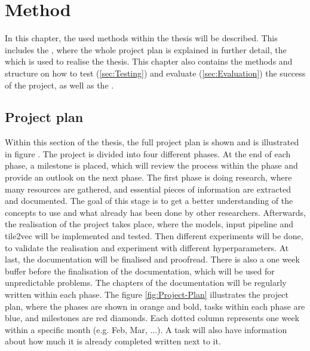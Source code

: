 \chapter{Method}
\label{ch:Method}

In this chapter, the used methods within the thesis will be described. This includes the , where the whole project plan is explained in further detail, the  which is used to realise the thesis. This chapter also contains the methods and structure on how to test (\ref{sec:Testing}) and evaluate (\ref{sec:Evaluation}) the success of the project, as well as the .

\section{Project plan}
\label{sec:Project-Plan}

Within this section of the thesis, the full project plan is shown and is illustrated in figure . The project is divided into four different phases. At the end of each phase, a milestone is placed, which will review the process within the phase and provide an outlook on the next phase. The first phase is doing research, where many resources are gathered, and essential pieces of information are extracted and documented. The goal of this stage is to get a better understanding of the concepts to use and what already has been done by other researchers. Afterwards, the realisation of the project takes place, where the models, input pipeline and tile2vec will be implemented and tested. Then different experiments will be done, to validate the realisation and experiment with different hyperparameters. At last, the documentation will be finalised and proofread. There is also a one week buffer before the finalisation of the documentation, which will be used for unpredictable problems. The chapters of the documentation will be regularly written within each phase.
\newline
\newline
The figure \ref{fig:Project-Plan} illustrates the project plan, where the phases are shown in orange and bold, tasks within each phase are blue, and milestones are red diamonds. Each dotted column represents one week within a specific month (e.g. Feb, Mar, ...). A task will also have information about how much it is already completed written next to it.

\storeareas{}
{}
\storeareas\landscapevalues

